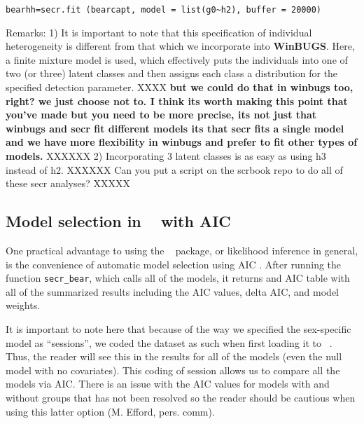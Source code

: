 \begin{verbatim}
bearhh=secr.fit (bearcapt, model = list(g0~h2), buffer = 20000)
\end{verbatim}

Remarks:  1) It is important to note that this specification of
individual heterogeneity is different from that which we incorporate
into \textbf{WinBUGS}.  Here, a finite mixture model is used, which effectively
puts the individuals into one of two (or three) latent classes and
then assigns each class a distribution for the specified detection
parameter. XXXX
{\bf but we could do that in winbugs too, right? we just
choose not to. I think its worth making this point that you've made
but you need to be more precise, its not just that winbugs and secr
fit different models its that secr fits a single model and we have
more flexibility in winbugs and prefer to fit other types of models.}
XXXXXX
  2) Incorporating 3 latent classes is as easy as using h3
instead of h2.  XXXXXX Can you put a script on the scrbook repo to do
all of these secr analyses? XXXXX
\begin{comment}
XXXXX if we have exercises in the book we'll put these at the end.
 For homework, the reader should incorporate
heterogeneity in sigma and using 2 and 3 classes.   Take note of any
warning messages or errors.
\end{comment}



\subsection{Model selection in \secr~ with AIC}

One practical advantage to using the \secr~ package, or likelihood
inference in general, is the convenience of automatic model selection
using AIC \citep{burnham_anderson:xxxxx}.
After running the function \mbox{\tt secr_bear}, which calls all of the models, it returns
and AIC table with all of the summarized results including the AIC values,
delta AIC, and model weights.  

It is important to note here that because of the way we specified the sex-specific model
as  ``sessions'', we 
coded the dataset as such when first loading it to \secr~.  
Thus, the reader will see this in the results 
for all of the models (even the null model with no covariates).  This
coding of session allows us to compare all the models via AIC.  There
is an issue with the AIC values for models with and without groups
that has not been resolved so the reader should be cautious when using
this latter option (M. Efford, pers. comm).


